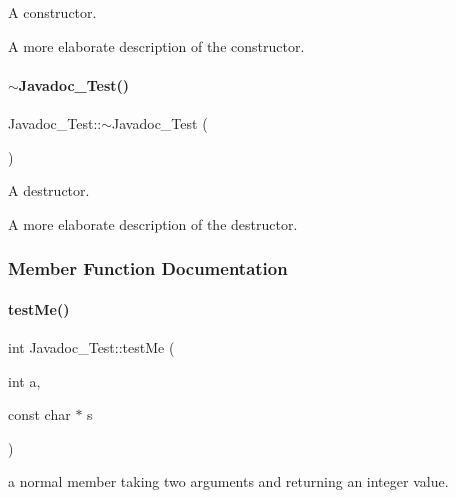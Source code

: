A constructor. 

A more elaborate description of the constructor. \mbox{\label{class_javadoc___test_a60016cd15a4ed82bbc35be79a0a6a6b5}} 
\paragraph{\texorpdfstring{$\sim$Javadoc\_Test()}{~Javadoc\_Test()}}
{\footnotesize\ttfamily Javadoc\+\_\+\+Test\+::$\sim$\+Javadoc\+\_\+\+Test (\begin{DoxyParamCaption}{ }\end{DoxyParamCaption})}



A destructor. 

A more elaborate description of the destructor. 

\subsubsection{Member Function Documentation}
\mbox{\label{class_javadoc___test_a0c472683ed25ff096e8a9edfb18d550c}} 
\paragraph{\texorpdfstring{testMe()}{testMe()}}
{\footnotesize\ttfamily int Javadoc\+\_\+\+Test\+::test\+Me (\begin{DoxyParamCaption}\item[{int}]{a,  }\item[{const char $\ast$}]{s }\end{DoxyParamCaption})}



a normal member taking two arguments and returning an integer value. 


